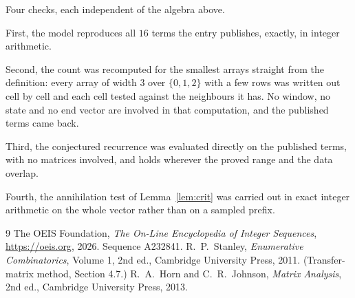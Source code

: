 \documentclass[11pt,a4paper]{article}
\theoremstyle{plain}
\theoremstyle{definition}
\begin{document}
Four checks, each independent of the algebra above.

First, the model reproduces all $16$ terms the entry publishes, exactly, in integer
arithmetic.

Second, the count was recomputed for the smallest arrays straight from the definition: every
array of width $3$ over $\{0,1,2\}$ with a few rows was written out cell by cell and each cell
tested against the neighbours it has. No window, no state and no end vector are involved in that
computation, and the published terms came back.

Third, the conjectured recurrence was evaluated directly on the published terms, with no
matrices involved, and holds wherever the proved range and the data overlap.

Fourth, the annihilation test of Lemma~\ref{lem:crit} was carried out in exact integer
arithmetic on the whole vector rather than on a sampled prefix.

\begin{thebibliography}{9}
 The OEIS Foundation, \emph{The On-Line Encyclopedia of Integer
Sequences}, \url{https://oeis.org}, 2026. Sequence A232841.
 R.~P.~Stanley, \emph{Enumerative Combinatorics}, Volume 1, 2nd ed.,
Cambridge University Press, 2011. (Transfer-matrix method, Section 4.7.)
 R.~A.~Horn and C.~R.~Johnson, \emph{Matrix Analysis}, 2nd ed., Cambridge
University Press, 2013.
\end{thebibliography}
\end{document}
